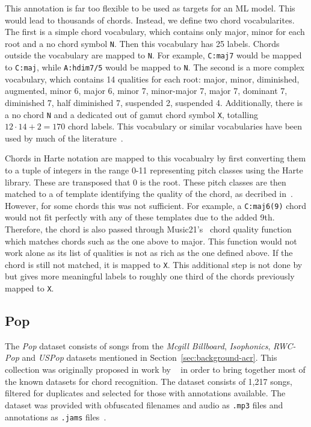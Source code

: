 This annotation is far too flexible to be used as targets for an ML model. This would lead to thousands of chords. Instead, we define two chord vocabularites. The first is a simple chord vocabulary, which contains only major, minor for each root and a no chord symbol \texttt{N}. Then this vocabulary has 25 labels. Chords outside the vocabulary are mapped to \texttt{N}. For example, \texttt{C:maj7} would be mapped to \texttt{C:maj}, while \texttt{A:hdim7/5} would be mapped to \texttt{N}. The second is a more complex vocabulary, which contains 14 qualities for each root: major, minor, diminished, augmented, minor 6, major 6, minor 7, minor-major 7, major 7, dominant 7, diminished 7, half diminished 7, suspended 2, suspended 4. Additionally, there is a no chord \texttt{N} and a dedicated out of gamut chord symbol \texttt{X}, totalling $12\cdot14 + 2 = 170$ chord labels. This vocabulary or similar vocabularies have been used by much of the literature~\citep{StructuredTraining,FourTimelyInsights,ACRLargeVocab1}.

Chords in Harte notation are mapped to this vocabualry by first converting them to a tuple of integers in the range 0-11 representing pitch classes using the Harte library. These are transposed that 0 is the root. These pitch classes are then matched to a of template identifying the quality of the chord, as decribed in~\citep{StructuredTraining}. However, for some chords this was not sufficient. For example, a \texttt{C:maj6(9)} chord would not fit perfectly with any of these templates due to the added 9th. Therefore, the chord is also passed through Music21's~\citep{music21} chord quality function which matches chords such as the one above to major. This function would not work alone as its list of qualities is not as rich as the one defined above. If the chord is still not matched, it is mapped to \texttt{X}. This additional step is not done by \citet{StructuredTraining} but gives more meaningful labels to roughly one third of the chords previously mapped to \texttt{X}.

\subsection{Pop}

The \emph{Pop} dataset consists of songs from the \emph{Mcgill Billboard}, \emph{Isophonics}, \emph{RWC-Pop} and \emph{USPop} datasets mentioned in Section~\ref{sec:background-acr}. This collection was originally proposed in work by ~\citet{FourTimelyInsights} in order to bring together most of the known datasets for chord recognition. The dataset consists of 1,217 songs, filtered for duplicates and selected for those with annotations available. The dataset was provided with obfuscated filenames and audio as \texttt{.mp3} files and annotations as \texttt{.jams} files~\citep{JAMS}. 

